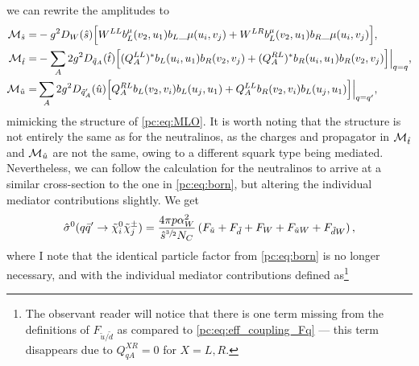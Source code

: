 \documentclass[../main.tex]{subfiles}
\begin{document}
we can rewrite the amplitudes to
\begin{subequations}
  \begin{align}
    \mathcal{M}_{\hat{s}} = & -g^2 D_W(\hat{s}) \Big[
      W^{LL} b_L^\mu(v_2, u_1){b_L}\_{\mu}(u_i, v_j) + W^{LR} b_L^\mu{(v_2, u_1)b_R}\_{\mu}(u_i, v_j)
    \Big],                                                             \\
    \mathcal{M}_{\hat{t}} = & -\sum_A 2g^2 D_{\tilde{q}_A}(\hat{t}) \Big[
      (Q_{A}^{LL})^\ast b_L(u_i, u_1) b_R(v_2, v_j) + (Q_{A}^{RL})^\ast b_R(u_i, u_1) b_R(v_2, v_j)
    \Big] \Big|_{q=q},                                                 \\
    \mathcal{M}_{\hat{u}} = & \sum_A 2g^2 D_{\tilde{q}^\prime_A}(\hat{u}) \Big[
      Q_{A}^{RL} b_L(v_2, v_i) b_L(u_j, u_1) + Q_{A}^{LL} b_R(v_2, v_i) b_L(u_j, u_1)
      \Big] \Big|_{q=q^\prime},
  \end{align}
\end{subequations}
mimicking the structure of \cref{pc:eq:MLO}.
It is worth noting that the structure is not entirely the same as for the neutralinos, as the charges and propagator in \(\mathcal{M}_{\hat{t}}\) and \(\mathcal{M}_{\hat{u}}\) are not the same, owing to a different squark type being mediated.
Nevertheless, we can follow the calculation for the neutralinos to arrive at a similar cross-section to the one in \cref{pc:eq:born}, but altering the individual mediator contributions slightly.
We get
\begin{equation}
  \hat\sigma^0(q\bar{q}^\prime \to \tilde\chi^0_i \tilde\chi^\pm_j) = \frac{4 \pi p \alpha_W^2}{\hat{s}^{\sfrac{3}{2}} N_C} \left(F_{\tilde{u}} + F_{\tilde{d}} + F_W + F_{\tilde{u}W} + F_{\tilde{d}W}\right),
\end{equation}
where I note that the identical particle factor from \cref{pc:eq:born} is no longer necessary, and with the individual mediator contributions defined as\footnote{The observant reader will notice that there is one term missing from the definitions of \(F_{\tilde{u}/\tilde{d}}\) as compared to \cref{pc:eq:eff_coupling_Fq} --- this term disappears due to \(Q_{qA}^{XR} = 0\) for \(X = L, R\).}
\end{document}
